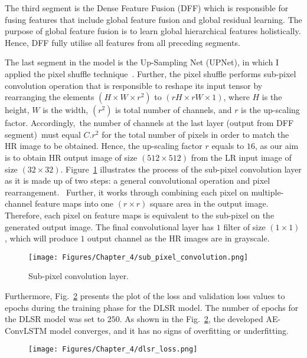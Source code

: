 The third segment is the Dense Feature Fusion (DFF) which is responsible for fusing features that include global feature fusion and global residual learning.
The purpose of global feature fusion is to learn global hierarchical features holistically.
Hence, DFF fully utilise all features from all preceding segments.

The last segment in the model is the Up-Sampling Net (UPNet), in which I applied the pixel shuffle technique~\cite{Shi2016}.
Further, the pixel shuffle performs sub-pixel convolution operation that is responsible to reshape its input tensor by rearranging the elements \((H\times W\times r^2)\) to \((rH\times rW\times 1)\), where \(H\) is the height, \(W\) is the width, \((r^2)\) is total number of channels, and \(r\) is the up-scaling factor.
Accordingly, the number of channels at the last layer (output from DFF segment) must equal \(C.r^2\) for the total number of pixels in order to match the HR image to be obtained.
Hence, the up-scaling factor \(r\) equals to \(16\), as our aim is to obtain HR output image of size \((512\times 512)\) from the LR input image of size \((32\times 32)\).
Figure~\ref{fig:sub_pixel_layer} illustrates the process of the sub-pixel convolution layer as it is made up of two steps: a general convolutional operation and pixel rearrangement. 
Further, it works through combining each pixel on multiple-channel feature maps into one \((r\times r)\) square area in the output image. 
Therefore, each pixel on feature maps is equivalent to the sub-pixel on the generated output image.
The final convolutional layer has \(1\) filter of size \((1\times 1)\), which will produce \(1\) output channel as the HR images are in grayscale. 
\begin{figure} [h!]
	\begin{center}
		\texttt{[image: Figures/Chapter\_4/sub\_pixel\_convolution.png]}
	\end{center}
	\caption{Sub-pixel convolution layer.} 
	\label{fig:sub_pixel_layer}
\end{figure}


Furthermore, Fig.~\ref{fig:dlsr_loss} presents the plot of the loss and validation loss values to epochs during the training phase for the DLSR model.
The number of epochs for the DLSR model was set to $250$.
As shown in the Fig.~\ref{fig:dlsr_loss}, the developed AE-ConvLSTM model converges, and it has no signs of overfitting or underfitting.
\begin{figure} [h!]
	\begin{center}
		\texttt{[image: Figures/Chapter\_4/dlsr\_loss.png]}
	\end{center}
	\caption{} 
	\label{fig:dlsr_loss}
\end{figure}

